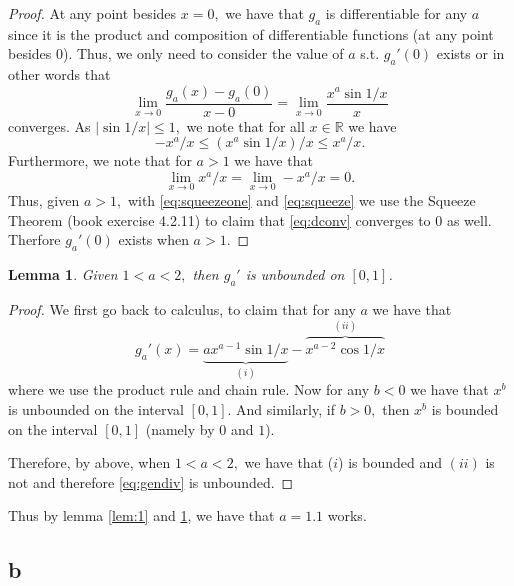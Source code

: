 \documentclass[10pt]{article}
\newtheorem{lemma}[]{Lemma}
\begin{document}
\begin{proof}
    At any point besides $x=0,$ we have that $g_a$ is differentiable for any $a$ since it is the product and composition of differentiable functions (at any point besides $0$). Thus, we only need to consider the value of $a$ s.t. $g_a'(0)$ exists or in other words that
    \begin{equation} \label{eq:dconv}
        \lim_{x\to 0}\frac{g_a(x)-g_a(0)}{x-0}=\lim_{x\to 0}\frac{x^a\sin1/x}{x}
    \end{equation}
    converges. As $|\sin 1/x|\le 1,$ we note that  for all $x\in\mathbb{R}$ we have 
    \begin{equation}\label{eq:squeezeone}
        -x^a/x\le (x^a\sin1/x)/x \le x^a/x.
    \end{equation}
    Furthermore, we note that for $a>1$ we have that 
    \begin{equation}\label{eq:squeeze}
        \lim_{x\to 0}x^a/x=\lim_{x\to 0}-x^a/x=0.
    \end{equation}
    Thus, given $a>1,$ with \eqref{eq:squeezeone} and \eqref{eq:squeeze} we use the Squeeze Theorem (book exercise 4.2.11) to claim that \eqref{eq:dconv} converges to $0$ as well. Therfore $g_a'(0)$ exists when $a>1.$
\end{proof}

\begin{lemma} \label{lem:2}
    Given $1<a<2,$ then $g_a'$ is unbounded on $[0,1]$.
\end{lemma}

\begin{proof}
    We first go back to calculus, to claim that for any $a$ we have that
    \begin{equation} \label{eq:gendiv}
        g_a'(x) = \underbrace{ax^{a-1}\sin 1/x}_{(i)} - \overbrace{x^{a-2} \cos1/x}^{(ii)}
    \end{equation}
    where we use the product rule and chain rule. Now for any $b<0$ we have that $x^b$ is unbounded on the interval $[0,1]$. And similarly, if $b>0,$ then $x^b$ is bounded on the interval $[0,1]$ (namely by $0$ and $1$).
    
    Therefore, by above, when $1<a < 2,$ we have that ($i$) is bounded and $(ii)$ is not and therefore \eqref{eq:gendiv} is unbounded.
\end{proof}

Thus by lemma \ref{lem:1} and \ref{lem:2}, we have that $a=1.1$ works.

\subsection*{b}
\end{document}
